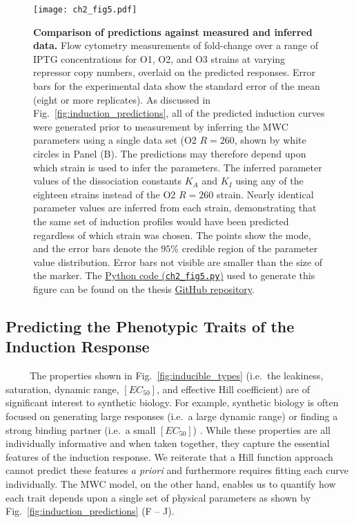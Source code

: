 \documentclass[12pt]{caltech_thesis}
\begin{document}
\hypertarget{fig:induction_experiments}{%
\begin{figure}
\centering
\texttt{[image: ch2\_fig5.pdf]}
\caption[{Comparison of predictions against measured and inferred
data.}]{\textbf{Comparison of predictions against measured and inferred
data.} Flow cytometry measurements of fold-change over a range of IPTG
concentrations for O1, O2, and O3 strains at varying repressor copy
numbers, overlaid on the predicted responses. Error bars for the
experimental data show the standard error of the mean (eight or more
replicates). As discussed in Fig.~\ref{fig:induction_predictions}, all
of the predicted induction curves were generated prior to measurement by
inferring the MWC parameters using a single data set (O2 \(R=260\),
shown by white circles in Panel (B). The predictions may therefore
depend upon which strain is used to infer the parameters. The inferred
parameter values of the dissociation constants \(K_A\) and \(K_I\) using
any of the eighteen strains instead of the O2 \(R=260\) strain. Nearly
identical parameter values are inferred from each strain, demonstrating
that the same set of induction profiles would have been predicted
regardless of which strain was chosen. The points show the mode, and the
error bars denote the \(95\)\% credible region of the parameter value
distribution. Error bars not visible are smaller than the size of the
marker. The
\href{https://github.com/gchure/phd/blob/master/src/chapter_02/code/ch2_fig5.py}{Python
code (\texttt{ch2\_fig5.py})} used to generate this figure can be found
on the thesis \href{https://github.com/gchure/phd}{GitHub repository}.}
\label{fig:induction_experiments}
\end{figure}
}

\hypertarget{predicting-the-phenotypic-traits-of-the-induction-response}{%
\subsection{Predicting the Phenotypic Traits of the Induction
Response}\label{predicting-the-phenotypic-traits-of-the-induction-response}}

~~~~~The properties shown in Fig.~\ref{fig:inducible_types} (i.e.~the
leakiness, saturation, dynamic range, \([EC_{50}]\), and effective Hill
coefficient) are of significant interest to synthetic biology. For
example, synthetic biology is often focused on generating large
responses (i.e.~a large dynamic range) or finding a strong binding
partner (i.e.~a small \([EC_{50}]\)) \autocite{brophy2014,shis2014}.
While these properties are all individually informative and when taken
together, they capture the essential features of the induction response.
We reiterate that a Hill function approach cannot predict these features
\emph{a priori} and furthermore requires fitting each curve
individually. The MWC model, on the other hand, enables us to quantify
how each trait depends upon a single set of physical parameters as shown
by Fig.~\ref{fig:induction_predictions} (F -- J).
\end{document}
